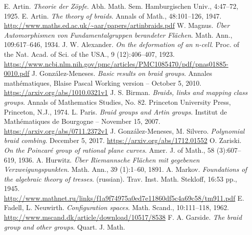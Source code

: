 \documentclass[TFG.tex]{subfiles}
\begin{document}
%

\begin{thebibliography}{}
 E. Artin. \emph{Theorie der Zöpfe}. Abh. Math. Sem. Hamburgischen Univ.,
4:47–72, 1925.
 E. Artin. \emph{The theory of braids}. Annals of Math., 48:101–126, 1947. \url{http://www.maths.ed.ac.uk/~aar/papers/artinbraids.pdf}
 W. Magnus. \emph{Über Automorphismen von Fundamentalgruppen berandeter
Flächen}. Math. Ann., 109:617–646, 1934.
 J. W. Alexander. \emph{On the deformation of an n-cell}. Proc. of the Nat.
Acad. of Sci. of the USA., 9 (12):406–407, 1923. \url{https://www.ncbi.nlm.nih.gov/pmc/articles/PMC1085470/pdf/pnas01885-0010.pdf}
 J. González-Meneses. \emph{Basic results on braid groups}. Annales mathématiques, Blaise Pascal Working version – October 5, 2010. \url{https://arxiv.org/abs/1010.0321v1}
 J. S. Birman. \emph{Braids, links and mapping class groups}. Annals of Mathematics
Studies, No. 82. Princeton University Press, Princeton, N.J.,
1974.
 L. Paris. \textit{Braid groups and Artin groups}. Institut de Mathématiques de Bourgogne – November 15, 2007. \url{https://arxiv.org/abs/0711.2372v1}
 J. González-Meneses, M. Silvero. \emph{Polynomial braid combing}. December 5, 2017. \url{https://arxiv.org/abs/1712.01552}
 O. Zariski. \emph{On the Poincaré group of rational plane curves}. Amer. J.
of Math., 58 (3):607–619, 1936.
 A. Hurwitz. \emph{Über Riemannsche Flächen mit gegebenen Verzweigungspunkten}.
Math. Ann., 39 (1):1–60, 1891.
 A. Markov. \emph{Foundations of the algebraic theory of tresses}. (russian).
Trav. Inst. Math. Stekloff, 16:53 pp., 1945. \url{http://www.mathnet.ru/links/f1a9f74975a0ed7e11860df5c4a69c58/tm911.pdf}
  E. Fadell, L. Neuwirth. \emph{Configuration spaces}. Math. Scand.,
10:111–118, 1962. \url{http://www.mscand.dk/article/download/10517/8538}
 F. A. Garside. \emph{The braid group and other groups}. Quart. J. Math.

\end{thebibliography}
\end{document}
